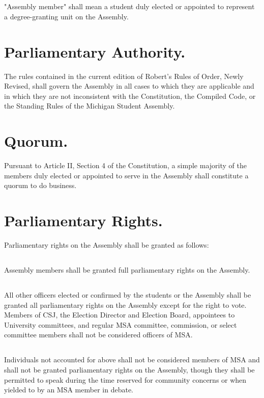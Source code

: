 \documentclass{rules}
\begin{document}
\subsection{}
"Assembly member" shall mean a student duly elected or appointed to represent a degree-granting unit on the Assembly.

\section{Parliamentary Authority.}
The rules contained in the current edition of Robert's Rules of Order, Newly Revised, shall govern the Assembly in all cases to which they are applicable and in which they are not inconsistent with the Constitution, the Compiled Code, or the Standing Rules of the Michigan Student Assembly.

\section{Quorum.}
Pursuant to Article II, Section 4 of the Constitution, a simple majority of the members duly elected or appointed to serve in the Assembly shall constitute a quorum to do business.

\section{Parliamentary Rights.}
Parliamentary rights on the Assembly shall be granted as follows:
\subsection{}
Assembly members  shall be granted full parliamentary rights on the Assembly.
\subsection{}
All other officers elected or confirmed by the students or the Assembly shall be granted all parliamentary rights on the Assembly except for the right to vote. Members of CSJ, the Election Director and Election Board, appointees to University committees, and regular MSA committee, commission, or select committee members shall not be considered officers of MSA.
\subsection{}
Individuals not accounted for above shall not be considered members of MSA and shall not be granted parliamentary rights on the Assembly, though they shall be permitted to speak during the time reserved for community concerns or when yielded to by an MSA member in debate.
\end{document}
